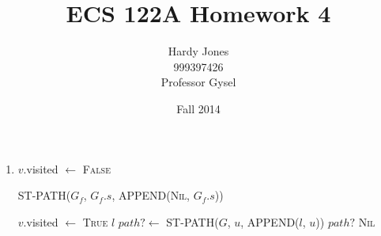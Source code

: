 \documentclass[12pt,letterpaper]{article}
\title{ECS 122A Homework 4\vspace{-2ex}}
\author{Hardy Jones\\
        999397426\\
        Professor Gysel\vspace{-2ex}}
\date{Fall 2014}
\begin{document}
  \maketitle

  \begin{enumerate}
    \item
      \begin{algorithm}
        \begin{algorithmic}
              \State $v$.visited $\gets$ \textsc{False}
            \EndFor

            \State \Return ST-PATH($G_f$, $G_f.s$, APPEND(\textsc{Nil}, $G_f.s$))
          \EndFunction
        \end{algorithmic}
      \end{algorithm}

      \begin{algorithm}
        \begin{algorithmic}
            \State $v$.visited $\gets$ \textsc{True}
              \State \Return $l$
            \EndIf
                \State $path? \gets$ ST-PATH($G$, $u$, APPEND($l$, $u$))
                  \State \Return $path?$
                \EndIf
              \EndIf
            \EndFor
            \State \Return \textsc{Nil}
          \EndFunction
        \end{algorithmic}
      \end{algorithm}
  \end{enumerate}
\end{document}
